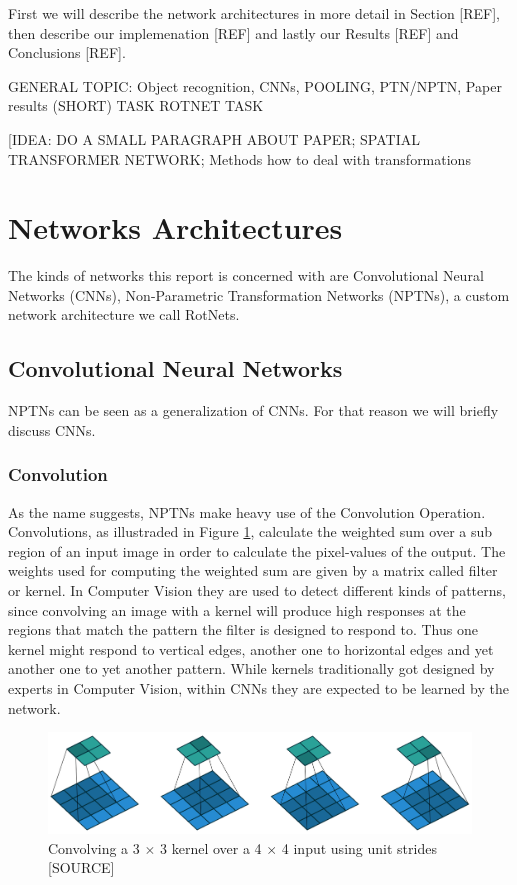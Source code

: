 \documentclass{llncs}
\begin{document}
First we will describe the network architectures in more detail in Section [REF], then describe our implemenation [REF] and lastly our Results [REF] and Conclusions [REF].

GENERAL TOPIC: Object recognition, CNNs, POOLING, PTN/NPTN, Paper results (SHORT) 
TASK
ROTNET TASK

[IDEA: DO A SMALL PARAGRAPH ABOUT PAPER; SPATIAL TRANSFORMER NETWORK; Methods how to deal with transformations

\section{Networks Architectures}
The kinds of networks this report is concerned with are Convolutional Neural Networks (CNNs), Non-Parametric Transformation Networks (NPTNs), a custom network architecture we call RotNets.

\subsection{Convolutional Neural Networks}
NPTNs can be seen as a generalization of CNNs. For that reason we will briefly discuss CNNs. 
\subsubsection{Convolution}
As the name suggests, NPTNs make heavy use of the Convolution Operation. Convolutions, as illustraded in Figure \ref{fig:conv}, calculate the weighted sum over a sub region of an input image in order to calculate the pixel-values of the output. The weights used for computing the weighted sum are given by a matrix called filter or kernel. In Computer Vision they are used to detect different kinds of patterns, since convolving an image with a kernel will produce high responses at the regions that match the pattern the filter is designed to respond to. Thus one kernel might respond to vertical edges, another  one to horizontal edges and yet another one to yet another pattern. While kernels traditionally got designed by experts in Computer Vision, within CNNs they are expected to be learned by the network.
\begin{figure}
	\begin{center}
		\includegraphics[width=\textwidth]{result_images/Conv.png}
		\caption{Convolving a 3 $\times$ 3 kernel over a 4 $\times$ 4 input using unit strides [SOURCE]}
		\label{fig:conv}
	\end{center}
\end{figure}
\end{document}
